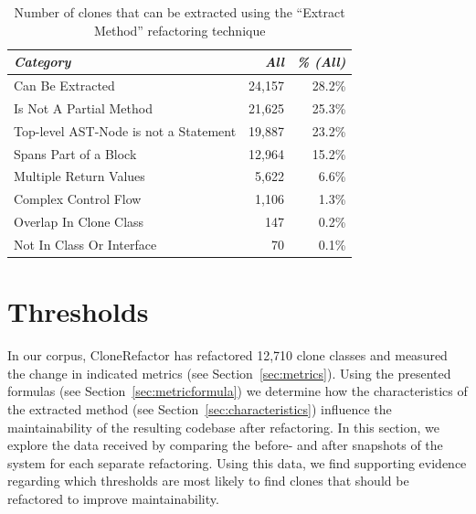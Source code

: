 \begin{table}[]
\centering
\begin{tabular}{@{}lrr@{}}
\toprule
\textit{\textbf{Category}} & \textit{\textbf{All}} & \textit{\textbf{\% (All)}} \\ \midrule
Can Be Extracted & 24,157 & 28.2\%  \\
Is Not A Partial Method & 21,625 & 25.3\% \\
Top-level AST-Node is not a Statement & 19,887 & 23.2\% \\
Spans Part of a Block & 12,964 & 15.2\%  \\
Multiple Return Values & 5,622 & 6.6\%  \\
Complex Control Flow & 1,106 & 1.3\% \\
Overlap In Clone Class & 147 & 0.2\% \\
Not In Class Or Interface & 70 & 0.1\% \\
\bottomrule
\end{tabular}
\caption{Number of clones that can be extracted using the ``Extract Method'' refactoring technique}
\label{tab:refactorability}
\end{table}

\section{Thresholds} \label{sec:refactoringexperiments}
In our corpus, CloneRefactor has refactored 12,710 clone classes and measured the change in indicated metrics (see Section~\ref{sec:metrics}). Using the presented formulas (see Section~\ref{sec:metricformula}) we determine how the characteristics of the extracted method (see Section~\ref{sec:characteristics}) influence the maintainability of the resulting codebase after refactoring. In this section, we explore the data received by comparing the before- and after snapshots of the system for each separate refactoring. Using this data, we find supporting evidence regarding which thresholds are most likely to find clones that should be refactored to improve maintainability.

